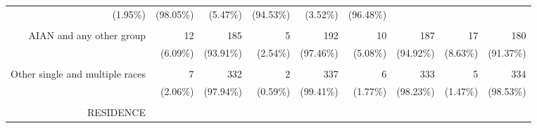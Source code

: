 \documentclass{article}
\begin{document}
\begin{tabular}{lllllllll}
  \multicolumn{1}{r}{(1.95\%)} &
  \multicolumn{1}{r}{(98.05\%)} &
  \multicolumn{1}{r}{(5.47\%)} &
  \multicolumn{1}{r}{(94.53\%)} &
  \multicolumn{1}{r}{(3.52\%)} &
  \multicolumn{1}{r}{(96.48\%)} \\
\multicolumn{1}{r}{} &
  \multicolumn{1}{|r}{} &
  \multicolumn{1}{r}{} &
  \multicolumn{1}{r}{} &
  \multicolumn{1}{r}{} &
  \multicolumn{1}{r}{} &
  \multicolumn{1}{r}{} &
  \multicolumn{1}{r}{} &
  \multicolumn{1}{r}{} \\
\multicolumn{1}{r}{AIAN and any other group\hspace{1em}} &
  \multicolumn{1}{|r}{12} &
  \multicolumn{1}{r}{185} &
  \multicolumn{1}{r}{5} &
  \multicolumn{1}{r}{192} &
  \multicolumn{1}{r}{10} &
  \multicolumn{1}{r}{187} &
  \multicolumn{1}{r}{17} &
  \multicolumn{1}{r}{180} \\
\multicolumn{1}{r}{} &
  \multicolumn{1}{|r}{(6.09\%)} &
  \multicolumn{1}{r}{(93.91\%)} &
  \multicolumn{1}{r}{(2.54\%)} &
  \multicolumn{1}{r}{(97.46\%)} &
  \multicolumn{1}{r}{(5.08\%)} &
  \multicolumn{1}{r}{(94.92\%)} &
  \multicolumn{1}{r}{(8.63\%)} &
  \multicolumn{1}{r}{(91.37\%)} \\
\multicolumn{1}{r}{} &
  \multicolumn{1}{|r}{} &
  \multicolumn{1}{r}{} &
  \multicolumn{1}{r}{} &
  \multicolumn{1}{r}{} &
  \multicolumn{1}{r}{} &
  \multicolumn{1}{r}{} &
  \multicolumn{1}{r}{} &
  \multicolumn{1}{r}{} \\
\multicolumn{1}{r}{Other single and multiple races\hspace{1em}} &
  \multicolumn{1}{|r}{7} &
  \multicolumn{1}{r}{332} &
  \multicolumn{1}{r}{2} &
  \multicolumn{1}{r}{337} &
  \multicolumn{1}{r}{6} &
  \multicolumn{1}{r}{333} &
  \multicolumn{1}{r}{5} &
  \multicolumn{1}{r}{334} \\
\multicolumn{1}{r}{} &
  \multicolumn{1}{|r}{(2.06\%)} &
  \multicolumn{1}{r}{(97.94\%)} &
  \multicolumn{1}{r}{(0.59\%)} &
  \multicolumn{1}{r}{(99.41\%)} &
  \multicolumn{1}{r}{(1.77\%)} &
  \multicolumn{1}{r}{(98.23\%)} &
  \multicolumn{1}{r}{(1.47\%)} &
  \multicolumn{1}{r}{(98.53\%)} \\
\multicolumn{1}{r}{} &
  \multicolumn{1}{|r}{} &
  \multicolumn{1}{r}{} &
  \multicolumn{1}{r}{} &
  \multicolumn{1}{r}{} &
  \multicolumn{1}{r}{} &
  \multicolumn{1}{r}{} &
  \multicolumn{1}{r}{} &
  \multicolumn{1}{r}{} \\
\multicolumn{1}{r}{RESIDENCE} &
  \multicolumn{1}{|r}{} &
  \multicolumn{1}{r}{} &
  \multicolumn{1}{r}{} &
  \multicolumn{1}{r}{} &
  \multicolumn{1}{r}{} &
  \multicolumn{1}{r}{} &

\end{tabular}
\end{document}
